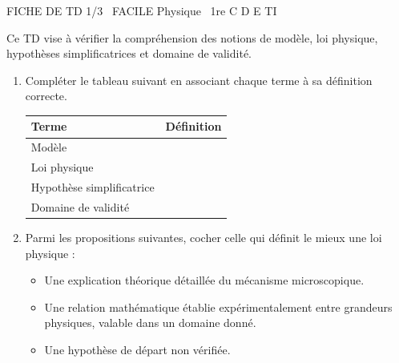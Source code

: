 \documentclass[11pt]{article}
\begin{document}
\begin{tcolorbox}[enhanced,colback=popink,colframe=popink,arc=10pt,boxrule=0pt,left=12pt,right=12pt,top=9pt,bottom=9pt]
{\color{white}\popxbold\small FICHE DE TD 1/3 \textbullet\ FACILE \hfill Physique \textbullet\ 1re C D E TI\par}
\end{tcolorbox}
\vspace{4pt}
Ce TD vise à vérifier la compréhension des notions de modèle, loi physique, hypothèses simplificatrices et domaine de validité.

\begin{exercice}
\begin{enumerate}
    \item Compléter le tableau suivant en associant chaque terme à sa définition correcte.
    \begin{tabular}{|p{3.5cm}|p{11cm}|}
    \hline
    \textbf{Terme} & \textbf{Définition} \\ \hline
    Modèle & \\ \hline
    Loi physique & \\ \hline
    Hypothèse simplificatrice & \\ \hline
    Domaine de validité & \\ \hline
    \end{tabular}
    \item Parmi les propositions suivantes, cocher celle qui définit le mieux une \og loi physique \fg :
    \begin{itemize}
        \item Une explication théorique détaillée du mécanisme microscopique.
        \item Une relation mathématique établie expérimentalement entre grandeurs physiques, valable dans un domaine donné.
        \item Une hypothèse de départ non vérifiée.
    \end{itemize}
\end{enumerate}
\end{exercice}
\end{document}
